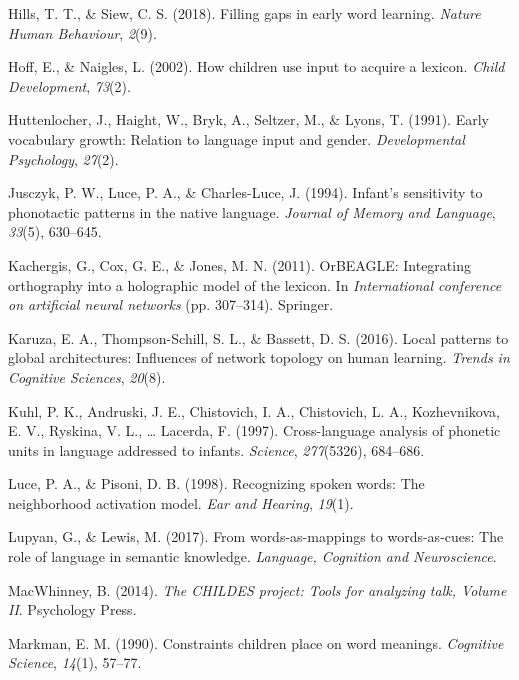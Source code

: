 \documentclass[english,,man,floatsintext]{apa6}
\begin{document}
\leavevmode\hypertarget{ref-hills2018}{}%
Hills, T. T., \& Siew, C. S. (2018). Filling gaps in early word learning. \emph{Nature Human Behaviour}, \emph{2}(9).

\leavevmode\hypertarget{ref-hoff2002}{}%
Hoff, E., \& Naigles, L. (2002). How children use input to acquire a lexicon. \emph{Child Development}, \emph{73}(2).

\leavevmode\hypertarget{ref-huttenlocher1991}{}%
Huttenlocher, J., Haight, W., Bryk, A., Seltzer, M., \& Lyons, T. (1991). Early vocabulary growth: Relation to language input and gender. \emph{Developmental Psychology}, \emph{27}(2).

\leavevmode\hypertarget{ref-jusczyk1994}{}%
Jusczyk, P. W., Luce, P. A., \& Charles-Luce, J. (1994). Infant's sensitivity to phonotactic patterns in the native language. \emph{Journal of Memory and Language}, \emph{33}(5), 630--645.

\leavevmode\hypertarget{ref-kachergis2011}{}%
Kachergis, G., Cox, G. E., \& Jones, M. N. (2011). OrBEAGLE: Integrating orthography into a holographic model of the lexicon. In \emph{International conference on artificial neural networks} (pp. 307--314). Springer.

\leavevmode\hypertarget{ref-karuza2016}{}%
Karuza, E. A., Thompson-Schill, S. L., \& Bassett, D. S. (2016). Local patterns to global architectures: Influences of network topology on human learning. \emph{Trends in Cognitive Sciences}, \emph{20}(8).

\leavevmode\hypertarget{ref-kuhl1997}{}%
Kuhl, P. K., Andruski, J. E., Chistovich, I. A., Chistovich, L. A., Kozhevnikova, E. V., Ryskina, V. L., \ldots{} Lacerda, F. (1997). Cross-language analysis of phonetic units in language addressed to infants. \emph{Science}, \emph{277}(5326), 684--686.

\leavevmode\hypertarget{ref-luce1998}{}%
Luce, P. A., \& Pisoni, D. B. (1998). Recognizing spoken words: The neighborhood activation model. \emph{Ear and Hearing}, \emph{19}(1).

\leavevmode\hypertarget{ref-lupyan2017}{}%
Lupyan, G., \& Lewis, M. (2017). From words-as-mappings to words-as-cues: The role of language in semantic knowledge. \emph{Language, Cognition and Neuroscience}.

\leavevmode\hypertarget{ref-macwhinney2014}{}%
MacWhinney, B. (2014). \emph{The CHILDES project: Tools for analyzing talk, Volume II}. Psychology Press.

\leavevmode\hypertarget{ref-markman90}{}%
Markman, E. M. (1990). Constraints children place on word meanings. \emph{Cognitive Science}, \emph{14}(1), 57--77.
\end{document}
